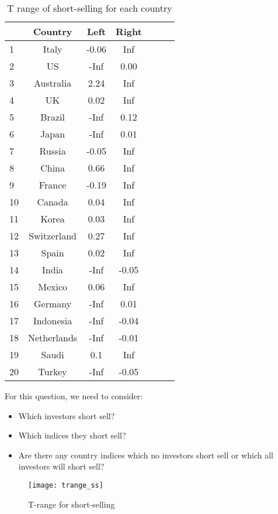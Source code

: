 \documentclass[
]{article}
\begin{document}
\begin{table}[!htb]
\centering
{\begin{tabular}{lcccccc} 
  \hline
 & Country & Left & Right \\ 
  \hline
1 & Italy & -0.06 & Inf \\ 
  2 & US & -Inf & 0.00 \\ 
  3 & Australia & 2.24 & Inf \\ 
  4 & UK & 0.02 & Inf \\ 
  5 & Brazil & -Inf & 0.12 \\ 
  6 & Japan & -Inf & 0.01 \\ 
  7 & Russia & -0.05 & Inf \\ 
  8 & China & 0.66 & Inf \\ 
  9 & France & -0.19 & Inf \\ 
  10 & Canada & 0.04 & Inf \\ 
  11 & Korea & 0.03 & Inf \\ 
  12 & Switzerland & 0.27 & Inf \\ 
  13 & Spain & 0.02 & Inf \\ 
  14 & India & -Inf & -0.05 \\ 
  15 & Mexico & 0.06 & Inf \\ 
  16 & Germany & -Inf & 0.01 \\ 
  17 & Indonesia & -Inf & -0.04 \\ 
  18 & Netherlands & -Inf & -0.01 \\ 
  19 & Saudi & 0.1 & Inf \\ 
  20 & Turkey & -Inf & -0.05 \\ 
   \hline
\end{tabular}}
\caption{T range of short-selling for each country}
\label{trange_ss_table}
\end{table}

For this question, we need to consider:

\begin{itemize}
\item
  Which investors short sell?
\item
  Which indices they short sell?
\item
  Are there any country indices which no investors short sell or which
  all investors will short sell?
\end{itemize}

\begin{figure}[!htb]
\texttt{[image: trange\_ss]}
\caption{T-range for short-selling}\label{trange_ss_png}
\end{figure}
\end{document}
